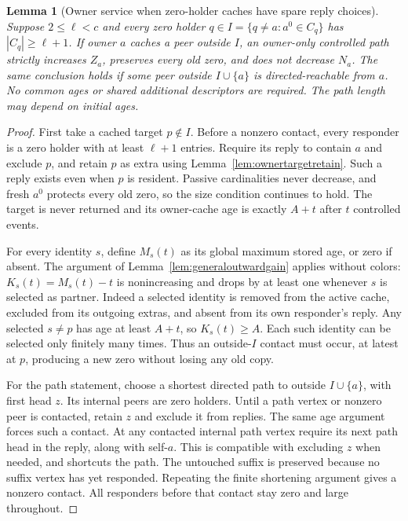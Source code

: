 \documentclass[11pt]{article}
\newtheorem{lemma}[theorem]{Lemma}
\begin{document}
\begin{lemma}[Owner service when zero-holder caches have spare reply choices]
\label{lem:largezerocallback}
Suppose $2\le\ell<c$ and every zero holder
$q\in I=\{q\ne a:a^0\in C_q\}$ has
$|C_q|\ge\ell+1$. If owner $a$ caches a peer outside
$I$, an owner-only controlled path strictly increases
$Z_a$, preserves every old zero, and does not decrease
$N_a$. The same conclusion holds if some peer outside
$I\cup\{a\}$ is directed-reachable from $a$.
No common ages or shared additional descriptors are
required. The path length may depend on initial ages.
\end{lemma}
\begin{proof}
First take a cached target $p\notin I$. Before a
nonzero contact, every responder is a zero holder
with at least $\ell+1$ entries. Require its reply to
contain $a$ and exclude $p$, and retain $p$ as extra
using Lemma~\ref{lem:ownertargetretain}. Such a reply
exists even when $p$ is resident. Passive cardinalities
never decrease, and fresh $a^0$ protects every old
zero, so the size condition continues to hold.
The target is never returned and its owner-cache age
is exactly $A+t$ after $t$ controlled events.

For every identity $s$, define $M_s(t)$ as its global
maximum stored age, or zero if absent. The argument
of Lemma~\ref{lem:generaloutwardgain} applies without
colors: $K_s(t)=M_s(t)-t$ is nonincreasing and drops
by at least one whenever $s$ is selected as partner.
Indeed a selected identity is removed from the active
cache, excluded from its outgoing extras, and absent
from its own responder's reply. Any selected $s\ne p$
has age at least $A+t$, so $K_s(t)\ge A$. Each such
identity can be selected only finitely many times.
Thus an outside-$I$ contact must occur, at latest at
$p$, producing a new zero without losing any old copy.

For the path statement, choose a shortest directed
path to outside $I\cup\{a\}$, with first head $z$.
Its internal peers are zero holders. Until a path
vertex or nonzero peer is contacted, retain $z$
and exclude it from replies. The same age argument
forces such a contact. At any contacted internal
path vertex require its next path head in the reply,
along with self-$a$. This is compatible with excluding
$z$ when needed, and shortcuts the path. The untouched
suffix is preserved because no suffix vertex has yet
responded. Repeating the finite shortening argument
gives a nonzero contact. All responders before that
contact stay zero and large throughout.
\end{proof}
\end{document}
